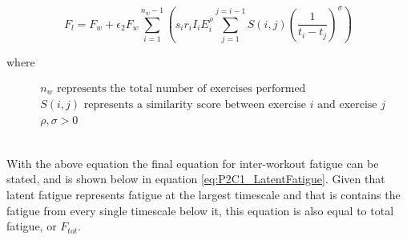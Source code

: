 \begin{minipage}{\textwidth}
	\begin{equation*}
		F_l =
			F_{w} + 
			\epsilon_2 F_w
			\sum_{i=1}^{n_w-1} \left( 
				s_i r_i I_i E_i^\rho
				\sum_{j=1}^{j=i-1} S(i,j)\left(
					\frac{1}{t_i-t_j}
				\right)^\sigma
			\right)
	\end{equation*}
	\centerline{where}
	\begin{equation*}
		\begin{split}
			& n_w \text{ represents the total number of exercises performed} \\
			& S(i,j) \text{ represents a similarity score between exercise }i \text{ and exercise }j \\
			& \rho, \sigma >0
		\end{split}
	\end{equation*}
\end{minipage}\\

With the above equation the final equation for inter-workout fatigue can be stated, and is shown below in equation \ref{eq:P2C1_LatentFatigue}. Given that latent fatigue represents fatigue at the largest timescale and that is contains the fatigue from every single timescale below it, this equation is also equal to total fatigue, or $F_{tot}$.

